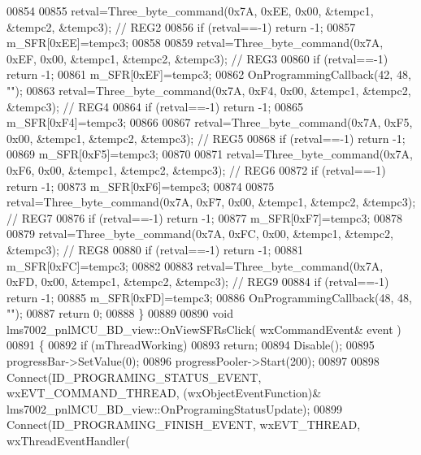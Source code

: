 \begin{DoxyCode}
{{{{{{{{{{{{{{{00854 
00855     retval=Three_byte_command(0x7A, 0xEE, 0x00, &tempc1, &tempc2, &tempc3); \textcolor{comment}{// REG2}
00856     \textcolor{keywordflow}{if} (retval==-1) \textcolor{keywordflow}{return} -1;
00857     m_SFR[0xEE]=tempc3;
00858 
00859     retval=Three_byte_command(0x7A, 0xEF, 0x00, &tempc1, &tempc2, &tempc3); \textcolor{comment}{// REG3}
00860     \textcolor{keywordflow}{if} (retval==-1) \textcolor{keywordflow}{return} -1;
00861     m_SFR[0xEF]=tempc3;
00862         OnProgrammingCallback(42, 48, \textcolor{stringliteral}{""});
00863     retval=Three_byte_command(0x7A, 0xF4, 0x00, &tempc1, &tempc2, &tempc3); \textcolor{comment}{// REG4}
00864     \textcolor{keywordflow}{if} (retval==-1) \textcolor{keywordflow}{return} -1;
00865     m_SFR[0xF4]=tempc3;
00866 
00867     retval=Three_byte_command(0x7A, 0xF5, 0x00, &tempc1, &tempc2, &tempc3); \textcolor{comment}{// REG5}
00868     \textcolor{keywordflow}{if} (retval==-1) \textcolor{keywordflow}{return} -1;
00869     m_SFR[0xF5]=tempc3;
00870 
00871     retval=Three_byte_command(0x7A, 0xF6, 0x00, &tempc1, &tempc2, &tempc3); \textcolor{comment}{// REG6}
00872     \textcolor{keywordflow}{if} (retval==-1) \textcolor{keywordflow}{return} -1;
00873     m_SFR[0xF6]=tempc3;
00874 
00875     retval=Three_byte_command(0x7A, 0xF7, 0x00, &tempc1, &tempc2, &tempc3); \textcolor{comment}{// REG7}
00876     \textcolor{keywordflow}{if} (retval==-1) \textcolor{keywordflow}{return} -1;
00877     m_SFR[0xF7]=tempc3;
00878 
00879     retval=Three_byte_command(0x7A, 0xFC, 0x00, &tempc1, &tempc2, &tempc3); \textcolor{comment}{// REG8}
00880     \textcolor{keywordflow}{if} (retval==-1) \textcolor{keywordflow}{return} -1;
00881     m_SFR[0xFC]=tempc3;
00882 
00883     retval=Three_byte_command(0x7A, 0xFD, 0x00, &tempc1, &tempc2, &tempc3); \textcolor{comment}{// REG9}
00884     \textcolor{keywordflow}{if} (retval==-1) \textcolor{keywordflow}{return} -1;
00885     m_SFR[0xFD]=tempc3;
00886         OnProgrammingCallback(48, 48, \textcolor{stringliteral}{""});
00887     \textcolor{keywordflow}{return} 0;
00888 \}
00889 
00890 \textcolor{keywordtype}{void} lms7002_pnlMCU_BD_view::OnViewSFRsClick( wxCommandEvent& event )
00891 \{
00892     \textcolor{keywordflow}{if} (mThreadWorking)
00893         \textcolor{keywordflow}{return};
00894     Disable();
00895     progressBar->SetValue(0);
00896     progressPooler->Start(200);
00897 
00898     Connect(ID_PROGRAMING_STATUS_EVENT, wxEVT\_COMMAND\_THREAD, (wxObjectEventFunction)&
      lms7002_pnlMCU_BD_view::OnProgramingStatusUpdate);
00899     Connect(ID_PROGRAMING_FINISH_EVENT, wxEVT\_THREAD, wxThreadEventHandler(
}}}}}}}}}}}}}}}
\end{DoxyCode}
